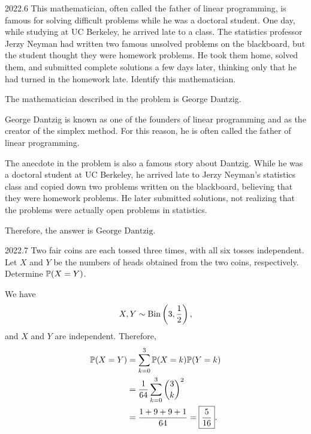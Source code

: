     \begin{pastproblem}{2022.6}
        This mathematician, often called the father of linear programming, is famous for solving
        difficult problems while he was a doctoral student. One day, while studying at UC Berkeley,
        he arrived late to a class. The statistics professor Jerzy Neyman had written two famous
        unsolved problems on the blackboard, but the student thought they were homework problems. He
        took them home, solved them, and submitted complete solutions a few days later, thinking
        only that he had turned in the homework late. Identify this mathematician.
    \end{pastproblem}

    \begin{solution}
        The mathematician described in the problem is George Dantzig.

        George Dantzig is known as one of the founders of linear programming and as the creator of
        the simplex method. For this reason, he is often called the father of linear programming.

        The anecdote in the problem is also a famous story about Dantzig. While he was a doctoral
        student at UC Berkeley, he arrived late to Jerzy Neyman's statistics class and copied down
        two problems written on the blackboard, believing that they were homework problems. He later
        submitted solutions, not realizing that the problems were actually open problems in
        statistics.

        Therefore, the answer is $\boxed{\text{George Dantzig}}$.
    \end{solution}

    \begin{pastproblem}{2022.7}
        Two fair coins are each tossed three times, with all six tosses
        independent. Let $X$ and $Y$ be the numbers of heads obtained from the
        two coins, respectively. Determine $\mathbb{P}(X=Y)$.
    \end{pastproblem}

    \begin{solution}
        We have
        \[
            X,Y\sim\operatorname{Bin}\left(3,\frac12\right),
        \]
        and $X$ and $Y$ are independent. Therefore,
        \[
            \begin{aligned}
                \mathbb{P}(X=Y)
                &=
                \sum_{k=0}^{3}\mathbb{P}(X=k)\mathbb{P}(Y=k)\\
                &=
                \frac{1}{64}\sum_{k=0}^{3}\binom{3}{k}^2\\
                &=
                \frac{1+9+9+1}{64}
                =
                \boxed{\frac{5}{16}}.
            \end{aligned}
        \]
    \end{solution}

